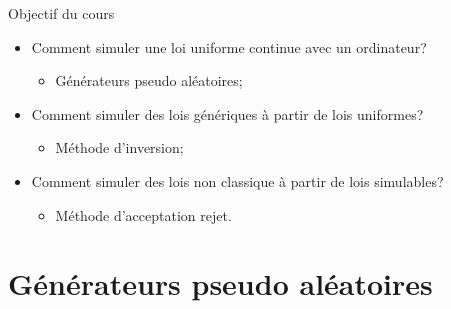 \documentclass[ignorenonframetext,]{beamer}
\providecommand{\tightlist}{%
  \setlength{\itemsep}{0pt}\setlength{\parskip}{0pt}}
\begin{document}
\begin{frame}{Objectif du cours}
\protect\hypertarget{objectif-du-cours}{}

\begin{itemize}
\tightlist
\item
  Comment simuler une loi uniforme continue avec un ordinateur?

  \begin{itemize}
  \tightlist
  \item
    Générateurs pseudo aléatoires;
  \end{itemize}
\item
  Comment simuler des lois génériques à partir de lois uniformes?

  \begin{itemize}
  \tightlist
  \item
    Méthode d'inversion;
  \end{itemize}
\item
  Comment simuler des lois non classique à partir de lois simulables?

  \begin{itemize}
  \tightlist
  \item
    Méthode d'acceptation rejet.
  \end{itemize}
\end{itemize}

\end{frame}

\hypertarget{guxe9nuxe9rateurs-pseudo-aluxe9atoires}{%
\section{Générateurs pseudo
aléatoires}\label{guxe9nuxe9rateurs-pseudo-aluxe9atoires}}
\end{document}
